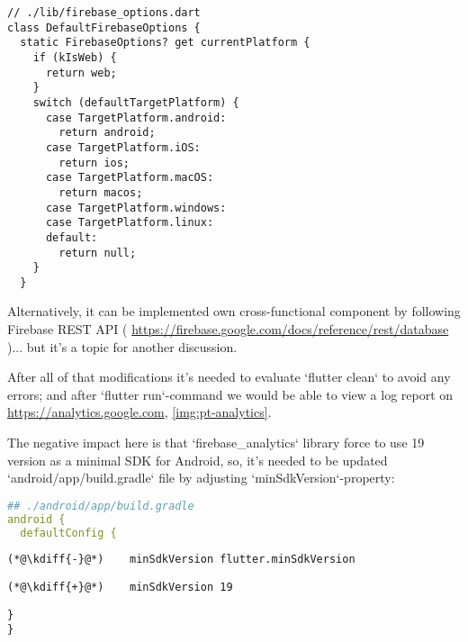 \begin{lstlisting}
// ./lib/firebase_options.dart
class DefaultFirebaseOptions {
  static FirebaseOptions? get currentPlatform {
    if (kIsWeb) {
      return web;
    }
    switch (defaultTargetPlatform) {
      case TargetPlatform.android:
        return android;
      case TargetPlatform.iOS:
        return ios;
      case TargetPlatform.macOS:
        return macos;
      case TargetPlatform.windows:
      case TargetPlatform.linux:
      default:
        return null;
    }
  }
\end{lstlisting}

Alternatively, it can be implemented own cross-functional component by following Firebase REST API (
\href{https://firebase.google.com/docs/reference/rest/database}{https://firebase.google.com/docs/reference/rest/database}
)... but it's a topic for another discussion.

After all of that modifications it's needed to evaluate `flutter clean` to avoid any errors; and after 
`flutter run`-command we would be able to view a log report on 
\href{https://analytics.google.com}{https://analytics.google.com}, \cref{img:pt-analytics}.


The negative impact here is that `firebase\_analytics` library force to use 19 version as a minimal SDK for Android, 
so, it's needed to be updated `android/app/build.gradle` file by adjusting `minSdkVersion`-property:

\begin{lstlisting}[language=yaml]
## ./android/app/build.gradle
android {
  defaultConfig {
\end{lstlisting}
{
\xpretocmd{\lstlisting}{\vspace{-12pt}}{}{}
\begin{lstlisting}[firstnumber=4, backgroundcolor=\color{backred}]
(*@\kdiff{-}@*)    minSdkVersion flutter.minSdkVersion
\end{lstlisting}
\begin{lstlisting}[firstnumber=4, backgroundcolor=\color{backgreen}]
(*@\kdiff{+}@*)    minSdkVersion 19
\end{lstlisting}
\begin{lstlisting}[firstnumber=5]
  }
}
\end{lstlisting}
}
